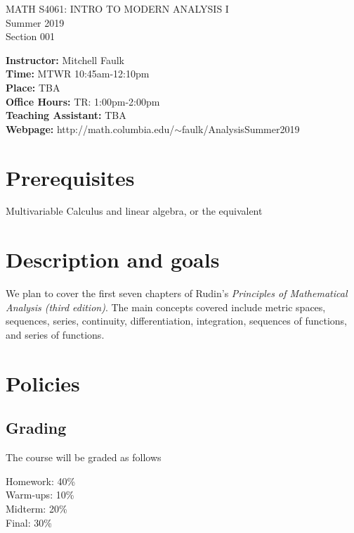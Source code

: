 \documentclass[12pt]{article}
\begin{document}
\begin{center}
MATH S4061: INTRO TO MODERN ANALYSIS I  \\
Summer 2019  \\
Section 001
\end{center}


\noindent \textbf{Instructor:} Mitchell Faulk \\
\textbf{Time:} MTWR 10:45am-12:10pm  \\
\textbf{Place:} TBA \\
\textbf{Office Hours:} TR: 1:00pm-2:00pm \\
\textbf{Teaching Assistant:} TBA \\
\textbf{Webpage:} http://math.columbia.edu/$\sim$faulk/AnalysisSummer2019

\section*{Prerequisites} 

Multivariable Calculus and linear algebra, or the equivalent


\section*{Description and goals}


We plan to cover the first seven chapters of Rudin's \emph{Principles of Mathematical Analysis (third edition)}. The main concepts covered include metric spaces, sequences, series, continuity, differentiation, integration, sequences of functions, and series of functions. 




\section*{Policies}

\subsection*{Grading}

The course will be graded as follows 

\vspace{3mm}


\noindent Homework: 40\%\\
Warm-ups: 10\% \\
Midterm: 20\% \\
Final: 30\%
\end{document}
